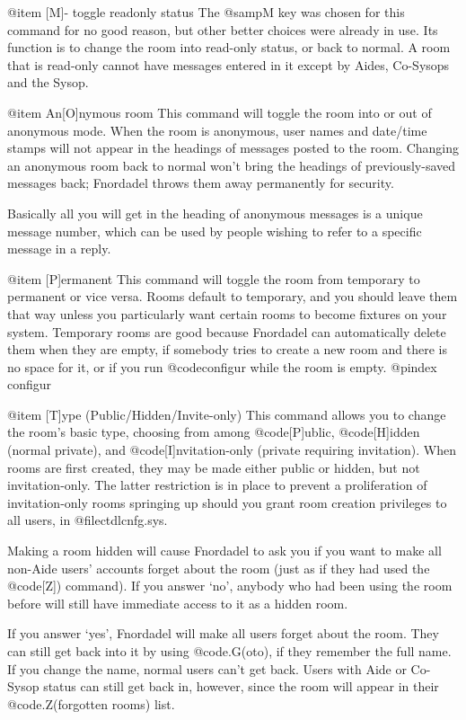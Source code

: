 @item [M]- toggle readonly status
The @samp{M} key was chosen for this command for no
good reason, but other better choices were already
in use.  Its function is to change the room into
read-only status, or back to normal.  A room that is
read-only cannot have messages entered in it except
by Aides, Co-Sysops and the Sysop.

@item An[O]nymous room
This command will toggle the room into or out
of anonymous mode.  When the room is anonymous, user
names and date/time stamps will not appear in the
headings of messages posted to the room.  Changing an
anonymous room back to normal won't bring the headings
of previously-saved messages back; Fnordadel throws
them away permanently for security.

Basically all you will get in the heading of
anonymous messages is a unique message number, which
can be used by people wishing to refer to a specific
message in a reply.

@item [P]ermanent
This command will toggle the room from
temporary to permanent or vice versa.  Rooms default
to temporary, and you should leave them that way
unless you particularly want certain rooms to become
fixtures on your system.  Temporary rooms are good
because Fnordadel can automatically delete them
when they are empty, if somebody tries to create a new
room and there is no space for it, or if you run
@code{configur} while the room is empty.
@pindex configur

@item [T]ype (Public/Hidden/Invite-only)
This command allows you to change the room's
basic type, choosing from among @code{[P]ublic}, @code{[H]idden}
(normal private), and @code{[I]nvitation-only} (private
requiring invitation).  When rooms are first created,
they may be made either public or hidden, but not
invitation-only.  The latter restriction is in place
to prevent a proliferation of invitation-only rooms
springing up should you grant room creation privileges
to all users, in @file{ctdlcnfg.sys}.

Making a room hidden will cause Fnordadel
to ask you if you want to make all non-Aide users'
accounts forget about the room (just as if they had
used the @code{[Z]}) command).  If you answer `no', anybody
who had been using the room before will still have
immediate access to it as a hidden room.

If you answer `yes', Fnordadel will make all
users forget about the room.  They can still get back
into it by using @code{.G(oto)}, if they remember the full
name.  If you change the name, normal users can't
get back.  Users with Aide or Co-Sysop status can still get back
in, however, since the room will appear in their
@code{.Z(forgotten rooms)} list.

